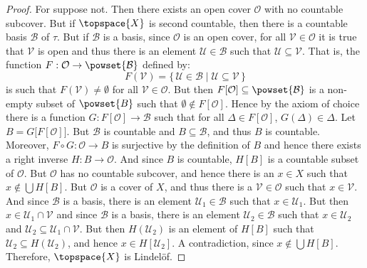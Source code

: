 \documentclass{article}                                                        %
\begin{document}
            \begin{proof}
                For suppose not. Then there exists an open cover $\mathcal{O}$ with
                no countable subcover. But if $\topspace{X}$ is second countable,
                then there is a countable basis $\mathcal{B}$ of $\tau$. But if
                $\mathcal{B}$ is a basis, since $\mathcal{O}$ is an open cover, for
                all $\mathcal{V}\in\mathcal{O}$ it is true that $\mathcal{V}$ is
                open and thus there is an element $\mathcal{U}\in\mathcal{B}$ such
                that $\mathcal{U}\subseteq\mathcal{V}$. That is, the function
                $F:\mathcal{O}\rightarrow\powset{\mathcal{B}}$ defined by:
                \begin{equation}
                    F(\mathcal{V})=\{\,\mathcal{U}\in\mathcal{B}\;|\;
                        \mathcal{U}\subseteq\mathcal{V}\,\}
                \end{equation}
                is such that $F(\mathcal{V})\ne\emptyset$ for all
                $\mathcal{V}\in\mathcal{O}$. But then
                $F[\mathcal{O}]\subseteq\powset{\mathcal{B}}$ is a non-empty subset
                of $\powset{B}$ such that $\emptyset\notin{F}[\mathcal{O}]$. Hence
                by the axiom of choice there is a function
                $G:F[\mathcal{O}]\rightarrow\mathcal{B}$ such that for all
                $\Delta\in{F}[\mathcal{O}]$, $G(\Delta)\in\Delta$. Let
                $B=G\big[F[\mathcal{O}]\big]$. But $\mathcal{B}$ is countable and
                $B\subseteq\mathcal{B}$, and thus $B$ is countable. Moreover,
                $F\circ{G}:\mathcal{O}\rightarrow{B}$ is surjective by the
                definition of $B$ and hence there exists a right inverse
                $H:B\rightarrow\mathcal{O}$. And since $B$ is countable,
                $H[B]$ is a countable subset of $\mathcal{O}$. But $\mathcal{O}$ has
                no countable subcover, and hence there is an $x\in{X}$ such that
                $x\notin\bigcup{H}[B]$. But $\mathcal{O}$ is a cover of $X$, and
                thus there is a $\mathcal{V}\in\mathcal{O}$ such that
                $x\in\mathcal{V}$. And since $\mathcal{B}$ is a basis, there is an
                element $\mathcal{U}_{1}\in\mathcal{B}$ such that
                $x\in\mathcal{U}_{1}$. But then $x\in\mathcal{U}_{1}\cap\mathcal{V}$
                and since $\mathcal{B}$ is a basis, there is an element
                $\mathcal{U}_{2}\in\mathcal{B}$ such that $x\in\mathcal{U}_{2}$ and
                $\mathcal{U}_{2}\subseteq\mathcal{U}_{1}\cap\mathcal{V}$. But then
                $H(\mathcal{U}_{2})$ is an element of $H[B]$ such that
                $\mathcal{U}_{2}\subseteq{H}(\mathcal{U}_{2})$, and hence
                $x\in{H}[\mathcal{U}_{2}]$. A contradiction, since
                $x\notin\bigcup{H}[B]$. Therefore, $\topspace{X}$ is Lindel\"{o}f.
            \end{proof}
\end{document}
